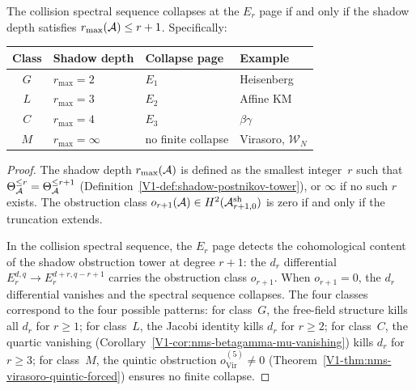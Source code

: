 \begin{proposition}
The collision spectral sequence collapses at the $E_r$ page if and
only if the shadow depth satisfies $r_{\max}(\mathcal{A}) \leq r + 1$.
Specifically:
\begin{center}
\renewcommand{\arraystretch}{1.2}
\begin{tabular}{@{}clll@{}}
\toprule
\textbf{Class} & \textbf{Shadow depth} & \textbf{Collapse page}
 & \textbf{Example} \\
\midrule
$G$ & $r_{\max} = 2$ & $E_1$ & Heisenberg \\
$L$ & $r_{\max} = 3$ & $E_2$ & Affine KM \\
$C$ & $r_{\max} = 4$ & $E_3$ & $\beta\gamma$ \\
$M$ & $r_{\max} = \infty$ & no finite collapse & Virasoro, $\mathcal{W}_N$ \\
\bottomrule
\end{tabular}
\end{center}
\end{proposition}

\begin{proof}
The shadow depth $r_{\max}(\mathcal{A})$ is defined as the smallest integer~$r$
such that $\Theta_{\mathcal{A}}^{\leq r} = \Theta_{\mathcal{A}}^{\leq r+1}$
(Definition~\ref{V1-def:shadow-postnikov-tower}), or $\infty$ if no such
$r$ exists. The obstruction class
$o_{r+1}(\mathcal{A}) \in H^2(\mathcal{A}^{\mathrm{sh}}_{r+1,0})$ is zero if and
only if the truncation extends.

In the collision spectral sequence, the $E_r$ page detects the
cohomological content of the shadow obstruction tower at degree $r+1$:
the $d_r$ differential $E_r^{d,q} \to E_r^{d+r,q-r+1}$
carries the obstruction class $o_{r+1}$. When $o_{r+1} = 0$,
the $d_r$ differential vanishes and the spectral sequence collapses.
The four classes correspond to the four possible patterns:
for class~$G$, the free-field structure kills all $d_r$ for
$r \geq 1$; for class~$L$, the Jacobi identity kills $d_r$
for $r \geq 2$; for class~$C$, the quartic vanishing
(Corollary~\ref*{V1-cor:nms-betagamma-mu-vanishing}) kills $d_r$ for
$r \geq 3$; for class~$M$, the quintic obstruction
$o^{(5)}_{\mathrm{Vir}} \neq 0$
(Theorem~\ref{V1-thm:nms-virasoro-quintic-forced}) ensures
no finite collapse.
\end{proof}


